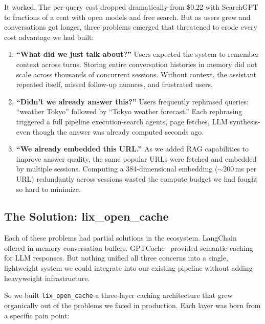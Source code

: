 \documentclass[conference]{IEEEtran}
\begin{document}
It worked. The per-query cost dropped dramatically-from \$0.22 with SearchGPT to fractions of a cent with open models and free search. But as users grew and conversations got longer, three problems emerged that threatened to erode every cost advantage we had built:

\begin{enumerate}
\item \textbf{``What did we just talk about?''} Users expected the system to remember context across turns. Storing entire conversation histories in memory did not scale across thousands of concurrent sessions. Without context, the assistant repeated itself, missed follow-up nuances, and frustrated users.

\item \textbf{``Didn't we already answer this?''} Users frequently rephrased queries: ``weather Tokyo'' followed by ``Tokyo weather forecast.'' Each rephrasing triggered a full pipeline execution-search agents, page fetches, LLM synthesis-even though the answer was already computed seconds ago.

\item \textbf{``We already embedded this URL.''} As we added RAG capabilities to improve answer quality, the same popular URLs were fetched and embedded by multiple sessions. Computing a 384-dimensional embedding (${\sim}200$\,ms per URL) redundantly across sessions wasted the compute budget we had fought so hard to minimize.
\end{enumerate}

\subsection{The Solution: lix\_open\_cache}

Each of these problems had partial solutions in the ecosystem. LangChain~\cite{langchain2023} offered in-memory conversation buffers. GPTCache~\cite{gptcache2023} provided semantic caching for LLM responses. But nothing unified all three concerns into a single, lightweight system we could integrate into our existing pipeline without adding heavyweight infrastructure.

So we built \texttt{lix\_open\_cache}-a three-layer caching architecture that grew organically out of the problems we faced in production. Each layer was born from a specific pain point:
\end{document}
